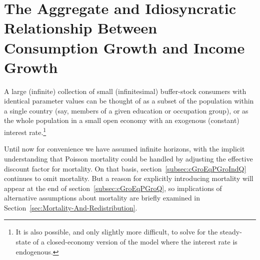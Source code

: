 \documentclass[BufferStockTheory]{subfiles}
\begin{document}
\begin{comment}
Appendix~\ref{sec:ApndxCGrowthDeclines} shows that the proposition holds true if there are only transitory (and no permanent) shocks.  The software archive associated with this paper contains an example in which exotic interactions between permanent shocks and extreme curvature that occurs with very small $\pZero$ generate a (small) region where the proposition does not hold.  In practice, for plausible parametric choices (and in models without an artificial liquidity constraint), $\Ex_{t}[\pmb{\Upsilon}_{t+1}^{\prime}]<0$ should generally hold.

\end{comment}

\hypertarget{The-Aggregate-and-Idiosyncratic-Relationship-Between-Consumption-Growth-and-Income-Growth}{}
\section{The Aggregate and Idiosyncratic Relationship Between
  Consumption Growth and Income Growth}

A large (infinite) collection of small (infinitesimal) buffer-stock consumers with identical parameter values can be thought of as a subset of the population within a single country (say, members of a given education or occupation group), or as the whole population in a small open economy with an exogenous (constant) interest rate.\footnote{It is also possible, and only slightly more difficult, to solve for the steady-state of a closed-economy version of the model where the interest rate is endogenous.}

Until now for convenience we have assumed infinite horizons, with the implicit understanding that Poisson mortality could be handled by adjusting the effective discount factor for mortality.  On that basis, section~\ref{subsec:cGroEqPGroIndQ} continues to omit mortality.  But a reason for explicitly introducing mortality will appear at the end of section~\ref{subsec:cGroEqPGroQ}, so implications of alternative assumptions about mortality are briefly examined in Section~\ref{sec:Mortality-And-Redistribution}.
\end{document}
